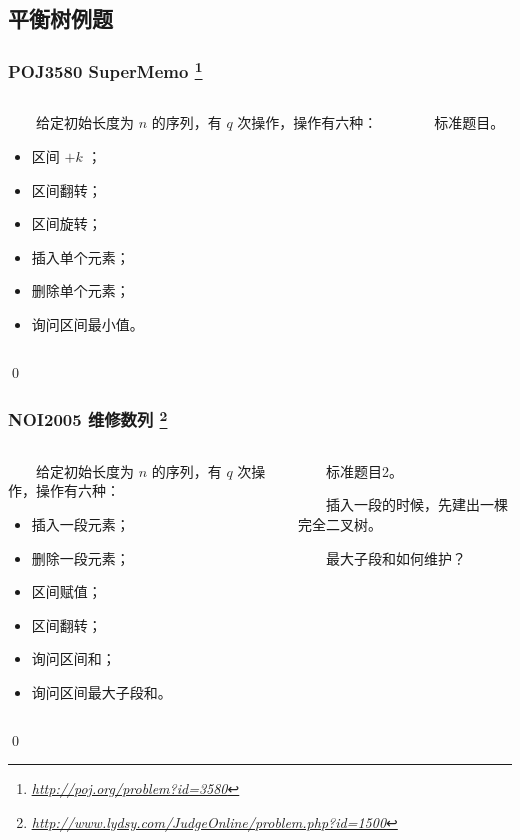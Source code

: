 \documentclass[9pt,dvipsnames,table]{beamer}
\newcommand{\hlink}[1]{
	\footnote{\fontsize{6pt}{\baselineskip}\href{#1}{\textsl{\underline{#1}}}}
}
\newenvironment{qedframe}{%
	\begin{frame}[environment=qedqedframe]%
	}{%
	\qed
	\end{frame}%
}
\begin{document}
\subsection{平衡树例题}
\begin{qedframe}
	\frametitle{POJ3580 SuperMemo\hlink{http://poj.org/problem?id=3580}}
	\begin{columns}
		\begin{column}{0.5\textwidth}
			　　给定初始长度为 $ n $ 的序列，有 $ q $ 次操作，操作有六种：
			\begin{itemize}
				\item 区间 $ +k $ ；
				\item 区间翻转；
				\item 区间旋转；
				\item 插入单个元素；
				\item 删除单个元素；
				\item 询问区间最小值。
			\end{itemize}
		\end{column} \pause
		\begin{column}{0.5\textwidth}
			　　标准题目。
		\end{column}
	\end{columns}
\end{qedframe}
\begin{qedframe}
	\frametitle{NOI2005 维修数列\hlink{http://www.lydsy.com/JudgeOnline/problem.php?id=1500}}
	\begin{columns}
		\begin{column}{0.5\textwidth}
			　　给定初始长度为 $ n $ 的序列，有 $ q $ 次操作，操作有六种：
			\begin{itemize}
				\item 插入一段元素；
				\item 删除一段元素；
				\item 区间赋值；
				\item 区间翻转；
				\item 询问区间和；
				\item 询问区间最大子段和。
			\end{itemize}
		\end{column} \pause
		\begin{column}{0.5\textwidth}
			　　标准题目2。
			
			　　插入一段的时候，先建出一棵完全二叉树。
			
			　　最大子段和如何维护？
		\end{column}
	\end{columns}
\end{qedframe}
\end{document}
